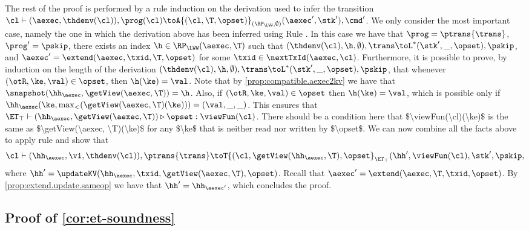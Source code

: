 The rest of the proof is performed by a rule induction on the derivation used to infer 
the transition $\cl \vdash (\aexec, \thdenv(\cl)), \prog(\cl) \toA{(\cl, \T, \opset)}_{(\RP_{\LWW}, \emptyset)} (\aexec', \stk'), \cmd'$. 
We only consider the most important case, namely the one in which the derivation above 
has been inferred using Rule . In this case we have that 
$\prog = \ptrans{\trans}$, $\prog' = \pskip$, there exists an index $\h \in \RP_{\LWW}(\aexec, \T)$ such that 
$(\thdenv(\cl), \h, \emptyset), \trans \toL^{\ast} (\stk', \_, \opset), \pskip$, and $\aexec' = 
\extend(\aexec, \txid, \T, \opset)$ for some $\txid \in \nextTxId(\aexec, \cl)$. 
Furthermore, it is possible to prove, by induction on the length of the derivation $(\thdenv(\cl), \h, \emptyset), \trans \toL^{\ast} (\stk', \_, \opset), \pskip$, 
that whenever $(\otR, \ke, \val) \in \opset$, then $\h(\ke) = \val$.
Note that by \cref{prop:compatible.aexec2kv} we have that $\snapshot(\hh_{\aexec}, \getView(\aexec, \T)) = 
\h$. Also, if $(\otR,\ke, \val) \in \opset$ then $\h(\ke) = \val$, which is possible only if  
$\hh_{\aexec}(\ke, \max_{<}(\getView(\aexec, \T)(\ke))) = (\val, \_, \_)$. This ensures 
that $\ET_{\top} \vdash (\hh_{\aexec}, \getView(\aexec, \T)) \triangleright \opset: \viewFun(\cl)$. 
\ac{There should be a condition here that $\viewFun(\cl)(\ke)$ is the same as $\getView(\aexec, \T)(\ke)$ 
for any $\ke$ that is neither read nor written by $\opset$.} 
We can now combine all the facts above to apply rule  and show that 
\[
\cl \vdash (\hh_{\aexec}, \vi, \thdenv(\cl)), \ptrans{\trans} \toT{(\cl, \getView(\hh_{\aexec}, \T), \opset}_{\ET_{\top}} 
(\hh', \viewFun(\cl), \stk', \pskip, 
\] 
where $\hh' = \updateKV(\hh_{\aexec}, \txid, \getView(\aexec, \T), \opset)$. 
Recall that $\aexec' = \extend(\aexec, \T, \txid, \opset)$. 
By \cref{prop:extend.update.sameop} we have that $\hh' = \hh_{\aexec'}$, 
which concludes the proof.

\subsection{Proof of \cref{cor:et-soundness}}
\label{sec:cor-et-soundness}

